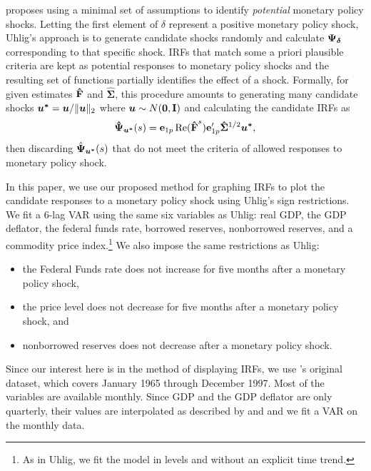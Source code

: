 \documentclass[AER,reviewmode]{tex/AEA}
\begin{document}
\citet{Uhl:05} proposes using a minimal set of assumptions to identify
\emph{potential} monetary policy shocks. Letting the first element of
$\delta$ represent a positive monetary policy shock, Uhlig's approach
is to generate candidate shocks randomly and calculate $\bm{\Psi}_{\bm{\delta}}$
corresponding to that specific shock. IRFs that match some a priori
plausible criteria are kept as potential responses to monetary policy
shocks and the resulting set of functions partially identifies the
effect of a shock. Formally, for given estimates $\bm{\hat \mathrm{F}}$ and
$\bm{\hat \Sigma}$, this procedure amounts to generating many candidate
shocks $\bm{u^*} = \bm{u} / \| \bm{u} \|_2$ where $\bm{u} \sim N(\bm{0},\mathbf{I})$ and calculating the
candidate IRFs as
\begin{equation}
  \label{eq:15}
  \bm{\hat \Psi}_{\bm{u^*}}(s) =
  \mathbf{e}_{1p} \operatorname{Re}(\bm{\hat{\mathrm{F}}}^s) \mathbf{e}_{1p}' \bm{\hat\Sigma}^{1/2} \bm{u^*},
\end{equation}
then discarding $\hat{\bm{\Psi}}_{\bm{u^*}}(s)$ that do not meet the criteria of
allowed responses to monetary policy shock.

In this paper, we use our proposed method for graphing IRFs to plot
the candidate responses to a monetary policy shock using Uhlig's sign
restrictions. We fit a 6-lag VAR using the same six variables as
Uhlig: real GDP, the GDP deflator, the federal funds rate, borrowed
reserves, nonborrowed reserves, and a commodity price
index.\footnote{%
  As in Uhlig, we fit the model in levels and without an explicit time
  trend.} %
We also impose the same restrictions as Uhlig:
\begin{itemize}
\item the Federal Funds rate does not increase for five months after a
  monetary policy shock,
\item the price level does not decrease for five months after a
  monetary policy shock, and
\item nonborrowed reserves does not decrease after a monetary policy
  shock.
\end{itemize}
Since our interest here is in the method of displaying IRFs, we use
\citeauthor{BeM:98}'s original dataset, which covers January 1965
through December 1997.  Most of the variables are available
monthly. Since GDP and the GDP deflator are only quarterly, their
values are interpolated as described by \citet{BGW:97} and
\citet{BeM:98} and we fit a VAR on the monthly data.
\end{document}

